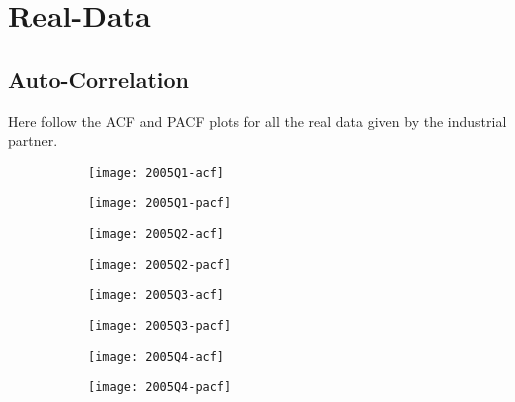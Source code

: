 \section{Real-Data}

\subsection{Auto-Correlation}

\def \mywidth {4cm}
\def \myfactor {0.23}

Here follow the ACF and PACF plots for all the real data given by the industrial partner.

\begin{figure}[htp]
	\centering
	\begin{subfigure}{0.23\textwidth}
		\centering
		\texttt{[image: 2005Q1-acf]}
		\end{subfigure}
	\begin{subfigure}{0.23\textwidth}
		\centering
		\texttt{[image: 2005Q1-pacf]}
		\end{subfigure}
		\begin{subfigure}{0.23\textwidth}
		\centering
		\texttt{[image: 2005Q2-acf]}
	\end{subfigure}
	\begin{subfigure}{0.23\textwidth}
		\centering
		\texttt{[image: 2005Q2-pacf]}
	\end{subfigure}
\end{figure}

\begin{figure}[htp]
	\centering
	\begin{subfigure}{0.23\textwidth}
		\centering
		\texttt{[image: 2005Q3-acf]}
	\end{subfigure}
	\begin{subfigure}{0.23\textwidth}
		\centering
		\texttt{[image: 2005Q3-pacf]}
	\end{subfigure}
	\begin{subfigure}{0.23\textwidth}
		\centering
		\texttt{[image: 2005Q4-acf]}
	\end{subfigure}
	\begin{subfigure}{0.23\textwidth}
		\centering
		\texttt{[image: 2005Q4-pacf]}
	\end{subfigure}
\end{figure}



